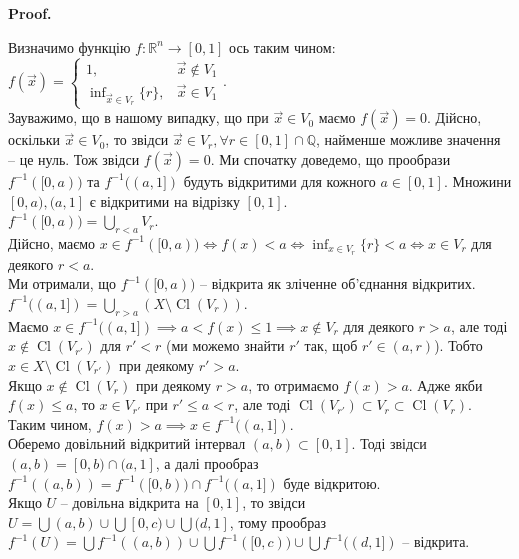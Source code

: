 \documentclass[a4paper, 10pt]{article}
\makeatletter
\def\qed{$\blacksquare$}
\theoremstyle{theoremdd}
\theoremstyle{theoremdd}
\theoremstyle{theoremdd}
\theoremstyle{theoremdd}
\theoremstyle{theoremdd}
\theoremstyle{theoremdd}
\theoremstyle{theoremdd}
\theoremstyle{theoremdd}
\renewenvironment{proof}[1][Proof.\\]{\par
\pushQED{\hfill \qed}%
\normalfont \topsep6\p@\@plus6\p@\relax
\trivlist
\item\relax
{\bfseries
#1\@addpunct{.}}\hspace\labelsep\ignorespaces
}{%
\popQED\endtrivlist\@endpefalse
}
\DeclareMathOperator{\Cl}{Cl}
\makeatother
\begin{document}
\begin{proof}
Визначимо функцію $f \colon \mathbb{R}^n \to [0,1]$ ось таким чином: $f(\vec{x}) = \begin{cases} 1, & \vec{x} \notin V_1 \\ \inf_{\vec{x} \in V_r} \{r\}, & \vec{x} \in V_1 \end{cases}$. \\
Зауважимо, що в нашому випадку, що при $\vec{x} \in V_0$ маємо $f(\vec{x}) = 0$. Дійсно, оскільки $\vec{x} \in V_0$, то звідси $\vec{x} \in V_r, \forall r \in [0,1] \cap \mathbb{Q}$, найменше можливе значення -- це нуль. Тож звідси $f(\vec{x}) = 0$.
Ми спочатку доведемо, що прообрази $f^{-1}([0,a))$ та $f^{-1}((a,1])$ будуть відкритими для кожного $a \in [0,1]$. Множини $[0,a),(a,1]$ є відкритими на відрізку $[0,1]$.\\
$f^{-1}([0,a)) = \displaystyle\bigcup_{r < a} V_r$. \\
Дійсно, маємо $x \in f^{-1}([0,a)) \iff f(x) < a \iff \displaystyle\inf_{x \in V_r} \{r\} < a \iff x \in V_r$ для деякого $r < a$.\\
Ми отримали, що $f^{-1}([0,a))$ -- відкрита як зліченне об'єднання відкритих.\\
$f^{-1}((a,1]) = \displaystyle\bigcup_{r > a} (X \setminus \Cl(V_r))$.\\
Маємо $x \in f^{-1}((a,1]) \implies a < f(x) \leq 1 \implies x \notin V_r$ для деякого $r > a$, але тоді $x \notin \Cl(V_{r'})$ для $r' < r$ (ми можемо знайти $r'$ так, щоб $r' \in (a,r)$). Тобто $x \in X \setminus \Cl(V_{r'})$ при деякому $r' > a$.\\
Якщо $x \notin \Cl(V_r)$ при деякому $r > a$, то отримаємо $f(x) > a$. Адже якби $f(x) \leq a$, то $x \in V_{r'}$ при $r' \leq a < r$, але тоді $\Cl(V_{r'}) \subset V_r \subset \Cl(V_r)$. Таким чином, $f(x) > a \implies x \in f^{-1}((a,1])$.\\
Оберемо довільний відкритий інтервал $(a,b) \subset [0,1]$. Тоді звідси $(a,b) = [0,b) \cap (a,1]$, а далі прообраз $f^{-1}((a,b)) = f^{-1}([0,b)) \cap f^{-1}((a,1])$ буде відкритою.\\
Якщо $U$ -- довільна відкрита на $[0,1]$, то звідси $U = \displaystyle\bigcup (a,b) \cup \displaystyle\bigcup [0,c) \cup \displaystyle\bigcup (d,1]$, тому прообраз\\
$f^{-1}(U) = \displaystyle\bigcup f^{-1}((a,b)) \cup \bigcup f^{-1}([0,c)) \cup \bigcup f^{-1}((d,1])$ -- відкрита.
\end{proof}
\end{document}
